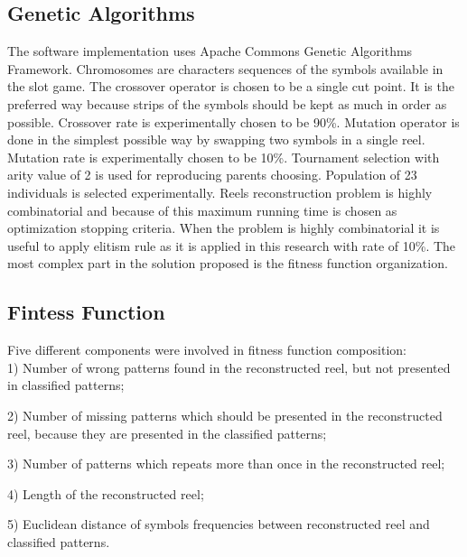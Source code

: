 \documentclass[a0,portrait,25pt]{sciposter}
\begin{document}
\begin{multicols}{3}
\begin{mdframed}[backgroundcolor=white,roundcorner=4pt,shadow=true,linewidth=1pt]
\color{Black}
\section*{Genetic Algorithms}
The software implementation uses Apache Commons Genetic Algorithms Framework. Chromosomes are characters sequences of the symbols available in the slot game. The crossover operator is chosen to be a single cut point. It is the preferred way because strips of the symbols should be kept as much in order as possible. Crossover rate is experimentally chosen to be 90\%. Mutation operator is done in the simplest possible way by swapping two symbols in a single reel. Mutation rate is experimentally chosen to be 10\%. Tournament selection with arity value of 2 is used for reproducing parents choosing. Population of 23 individuals is selected experimentally. Reels reconstruction problem is highly combinatorial and because of this maximum running time is chosen as optimization stopping criteria. When the problem is highly combinatorial it is useful to apply elitism rule as it is applied in this research with rate of 10\%. The most complex part in the solution proposed is the fitness function organization. 
\end{mdframed}

\begin{mdframed}[backgroundcolor=white,roundcorner=4pt,shadow=true,linewidth=1pt]
\color{Black}
\section*{Fintess Function}
Five different components were involved in fitness function composition: \\

1) Number of wrong patterns found in the reconstructed reel, but not presented in classified patterns; 

2) Number of missing patterns which should be presented in the reconstructed reel, because they are presented in the classified patterns; 

3) Number of patterns which repeats more than once in the reconstructed reel; 

4) Length of the reconstructed reel; 

5) Euclidean distance of symbols frequencies between reconstructed reel and classified patterns. \\


\end{mdframed}
\end{multicols}
\end{document}
